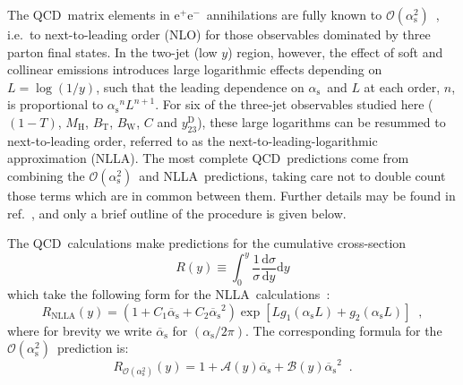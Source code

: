 \documentclass[12pt,a4paper,twoside]{article}
\newcommand{\epem}   {\ensuremath{\mathrm{e^+e^-}}}
\newcommand{\as}     {\ensuremath{\alpha_{\mathrm{s}}}}
\newcommand{\asb}    {\ensuremath{\overline{\alpha}_{\mathrm{s}}}}
\newcommand{\asbsq}    {\ensuremath{\overline{\alpha}_{\mathrm{s}}}^2}
\newcommand{\oaa}    {\ensuremath{\mathcal{O}(\alpha_{\mathrm{s}}^2)}}
\newcommand{\bt}     {\ensuremath{B_{\mathrm{T}}}}
\newcommand{\bw}     {\ensuremath{B_{\mathrm{W}}}}
\newcommand{\mh}     {\ensuremath{M_{\mathrm{H}}}}
\newcommand{\ytwothree}   {\ensuremath{y^{\mathrm{D}}_{23}}}
\newcommand{\dd}    {\ensuremath{\mathrm{d}}}
\newcommand{\qcd}{\mbox{QCD}}
\newcommand{\nlla}{\mbox{NLLA}}
\newcommand{\nlo}{\mbox{NLO}}
\begin{document}
The \qcd\ matrix elements in \epem\ annihilations are fully known to
\oaa~\cite{ERT}, i.e.\ to next-to-leading order (\nlo) for 
those observables dominated by three parton final states.
In the two-jet (low $y$) region, however, the effect of soft and 
collinear emissions introduces large logarithmic 
effects depending on $L=\log(1/y)$, such that the leading dependence
on \as\ and $L$ at each order, $n$, is proportional to $\as^n L^{n+1}$. 
For six of the 
three-jet observables studied here ($(1-T)$, \mh, \bt, \bw, $C$ and
\ytwothree), these large logarithms can
be resummed to next-to-leading order, referred to as the 
next-to-leading-logarithmic approximation (\nlla).  
The most complete \qcd\ predictions come from combining the
\oaa\ and \nlla\ predictions, taking care not to double count those 
terms which are in common between them.
Further details may be found in ref.~\cite{LEPQCDWG1,OPALPR075}, and only a brief 
outline of the procedure is given below.

The \qcd\ calculations make predictions for the cumulative cross-section
\begin{equation}
R(y) \equiv \int_0^y \frac{1}{\sigma}\frac{\dd\sigma}{\dd y} \dd y
\label{eq-match1}
\end{equation}
which take the following form for the \nlla\ 
calculations~\cite{nllathmh,nllay23,nllabtbw2,nllacp}:
\begin{equation}
R_{\mathrm{NLLA}}(y)=(1+C_1\asb+C_2\asbsq) \exp [
L g_1(\as L) + g_2(\as L) ] \;\;,
\label{eq-match4}
\end{equation}
where for brevity we write $\asb$ for $(\as/2\pi)$.
The corresponding formula for the \oaa\ prediction is:
\begin{equation}
R_{\oaa}(y)= 1+ \mathcal{A}(y) \asb + \mathcal{B}(y) \asbsq \;\; .
\label{eq-match5}
\end{equation}
\end{document}
